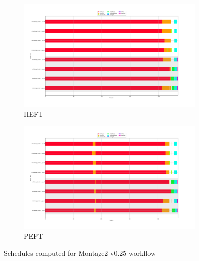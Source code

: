 \begin{figure}[H]
\begin{subfigure}{1.0\textwidth}
\centering
\includegraphics[width=1\linewidth]{figures/5-2-montage025_heft.png}
\caption[Schedules computed for Montage2-v0.25 workflow - HEFT]{HEFT}
\label{fig:setup-input:m025:heft}
\end{subfigure}
\begin{subfigure}{1.0\textwidth}
\centering
\includegraphics[width=1\linewidth]{figures/5-2-montage025_peft.png}
\caption[Schedules computed for Montage2-v0.25 workflow - PEFT]{PEFT}
\label{fig:setup-input:m025:peft}
\end{subfigure}
\centering
\caption[Schedules computed for Montage2-v0.25 workflow]{Schedules computed for Montage2-v0.25 workflow}
\label{fig:setup-input:m025}
\end{figure}

